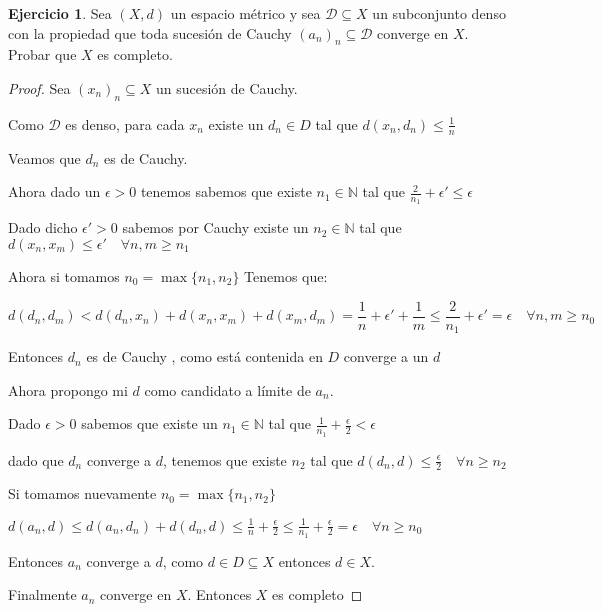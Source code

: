 \documentclass[11pt]{report}
\newcommand{\N}{\mathbb{N}}
\theoremstyle{definition}
\newtheorem{ej}{Ejercicio}
\begin{document}
	\begin{ej}
		Sea $(X,d)$ un espacio métrico y sea $\mathcal{D} \subseteq X$ un subconjunto denso con la propiedad que toda sucesión de Cauchy $(a_n)_n \subseteq \mathcal{D}$ converge en $X$. Probar que $X$ es completo.
		\begin{proof}
			Sea $(x_n)_n \subseteq X$ un sucesión de Cauchy.

			Como $\mathcal{D}$ es denso, para cada $x_n$ existe un $d_n \in D$ tal que $d(x_n,d_n) \leq \frac{1}{n}$

			Veamos que $d_n$ es de Cauchy.

			Ahora dado un $\epsilon > 0 $ tenemos sabemos que existe  $n_1 \in \N$ tal que $\frac{2}{n_1} + \epsilon ' \leq \epsilon$

			Dado dicho $\epsilon ' > 0 $ sabemos por Cauchy existe un $n_2\in \N$ tal que $d(x_n,x_m )\leq \epsilon ' \quad \forall n,m \geq n_1$

			Ahora si tomamos $n_0 = \max\{n_1,n_2\}$ Tenemos que:
			
			$$d(d_n,d_m) < d(d_n,x_n) + d(x_n,x_m) + d(x_m,d_m) = \frac{1}{n} + \epsilon ' + \frac{1}{m} \leq \frac{2}{n_1} + \epsilon '=\epsilon \quad \forall n,m \geq n_0$$

			Entonces $d_n$ es de Cauchy , como está contenida en $D$ converge a un $d$

			Ahora propongo mi $d$ como candidato a límite de $a_n$.

		Dado $\epsilon >0$ sabemos que existe un $n_1 \in \N$ tal que $\frac{1}{n_1} + \frac{\epsilon}{2} < \epsilon$

			dado que $d_n$ converge a $d$, tenemos que existe $n_2$ tal que $d(d_n,d) \leq \frac{\epsilon}{2} \quad \forall n \geq n_2$

			Si tomamos nuevamente $n_0 = \max\{n_1,n_2\}$

			$d(a_n,d) \leq d(a_n,d_n) + d(d_n,d) \leq \frac{1}{n} +\frac{\epsilon}{2} \leq \frac{1}{n_1}+\frac{\epsilon}{2}  = \epsilon \quad \forall n \geq n_0 $ 

			Entonces $a_n$ converge a $d$, como $d\in D \subseteq X$ entonces $d \in X$.

			Finalmente $a_n$ converge en $X$. Entonces $X$ es completo
		\end{proof}
	\end{ej}
\end{document}
